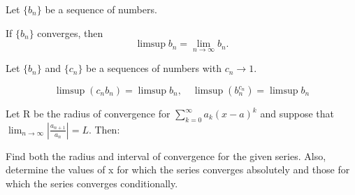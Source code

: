 \documentclass[week=11]{homework}
\date{\today}
\begin{document}
    \maketitle
    \thispagestyle{empty}
    \newpage
    \begin{questions}
		\let\firstquestion\question
		\renewcommand*{\question}{\vspace{7mm}\firstquestion}
        \firstquestion
		Let $\{b_n \}$ be a sequence of numbers. 
		\begin{inlinetoprove}
			If $\{b_n \}$ converges, then 
			\[
				\limsup b_n = \lim_{n \to \infty} b_n.
			\]
		\end{inlinetoprove}
		
		\question
		Let $\{b_n \}$ and $\{c_n \}$ be a sequences of numbers with $c_n \to 1$. 
		\begin{inlinetoprove}
			\[
				\limsup (c_n b_n) = \limsup b_n, \quad \limsup (b_n^{c_n}) = \limsup b_n
			\]
		\end{inlinetoprove}
		
		\question
		Let R be the radius of convergence for $\sum_{k=0}^{\infty} a_k (x - a)^k$ and suppose that $\lim_{n \to \infty} \left| \frac{a_{n+1}}{a_n} \right| = L$. Then:
		
		\question
		Find both the radius and interval of convergence for the given series. Also, determine the values of x for which the series converges absolutely and those for which the series converges conditionally. 
\end{questions}
\end{document}
